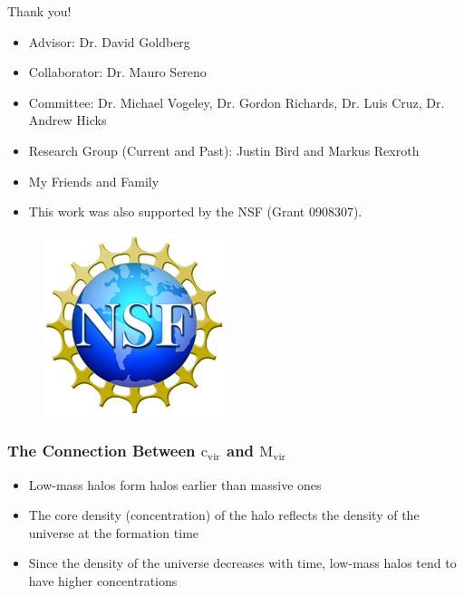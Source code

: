 \documentclass[hyperref={pdfpagelabels=false}]{beamer}
\begin{document}
\begin{frame}
\centerline{Thank you!}
\begin{itemize}
\item Advisor: Dr. David Goldberg
\item Collaborator: Dr. Mauro Sereno
\item Committee: Dr. Michael Vogeley, Dr. Gordon Richards, Dr. Luis Cruz, Dr. Andrew Hicks
\item Research Group (Current and Past): Justin Bird and Markus Rexroth
\item My Friends and Family
\item This work was also supported by the NSF (Grant 0908307).
\end{itemize}
\begin{figure}
\centering
\includegraphics[height=0.20\textheight]{NSF_logo.jpg}
\end{figure}
\end{frame}


\appendix

%  

\begin{frame}
\frametitle{The Connection Between $\mathrm{c_{vir}}$ and $\mathrm{M_{vir}}$}
        \begin{itemize}
        \item Low-mass halos form halos earlier than massive ones
        \item The core density (concentration) of the halo reflects the density of the universe
          at the formation time
        \item Since the density of the universe decreases with time, low-mass
          halos tend to have higher concentrations 
        \end{itemize}
\end{frame}
\end{document}
